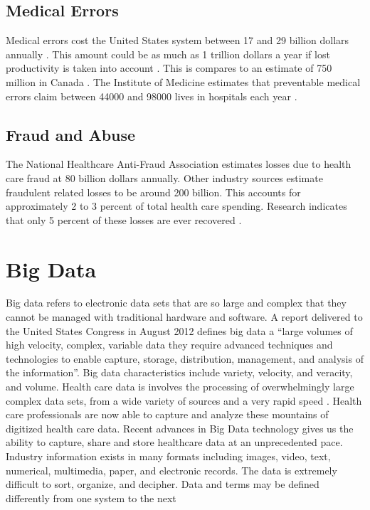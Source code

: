 \documentclass[sigconf]{acmart}
\begin{document}
\subsection{Medical Errors}
Medical errors cost the United States system between 17 and 29 billion dollars annually \cite{Milman}. This amount could be as much as 1 trillion dollars a year if lost productivity is taken into account \cite{www-google-pracfus}. This is compares to an estimate of 750 million in Canada \cite{Milman}.  The Institute of Medicine estimates that preventable medical errors claim between 44000 and 98000 lives in hospitals each year \cite{milbank}.
\subsection{Fraud and Abuse}
The National Healthcare Anti-Fraud Association estimates losses due to health care fraud at 80 billion dollars annually. Other industry sources estimate fraudulent related losses to be around 200 billion. This accounts for approximately 2 to 3 percent of total health care spending. Research indicates that only 5 percent of these losses are ever recovered \cite{www-google-datameer}.

\section{Big Data}

Big data refers to electronic data sets that are so large and complex that they cannot be managed with traditional hardware and software. A report delivered to the United States Congress in August 2012 defines big data a “large volumes of high velocity, complex, variable data they require advanced techniques and technologies to enable capture, storage, distribution, management, and analysis of the information”. Big data characteristics include variety, velocity, and veracity, and volume.  Health care data is involves the processing of overwhelmingly large complex data sets, from a wide variety of sources and a very rapid speed \cite{springer}.  Health care professionals are now able to capture and analyze these mountains of digitized health care data. Recent advances in Big Data technology gives us the ability to capture, share and store healthcare data at an unprecedented pace. Industry information exists in many formats including images, video, text, numerical, multimedia, paper, and electronic records. The data is extremely difficult to sort, organize, and decipher.  Data and terms may be defined differently from one system to the next \cite{www-google-digit}
\end{document}
